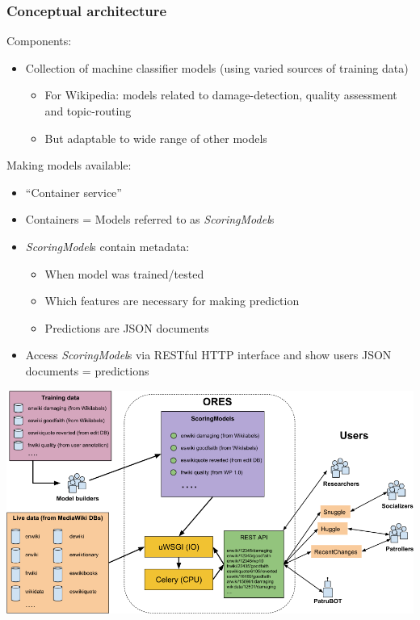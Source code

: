 \documentclass[12pt,a4paper]{article}
\begin{document}
\subsubsection{Conceptual architecture}
Components:
\begin{itemize}
\item Collection of machine classifier models (using varied sources of training data)
\begin{itemize}
\item For Wikipedia: models related to damage-detection, quality assessment and topic-routing
\item But adaptable to wide range of other models
\end{itemize}
\end{itemize}
Making models available:
\begin{itemize}
\item ``Container service''
\item Containers = Models referred to as \textit{ScoringModel}s
\item \textit{ScoringModel}s contain metadata:
\begin{itemize}
\item When model was trained/tested
\item Which features are necessary for making prediction
\item Predictions are JSON documents
\end{itemize}
\item Access \textit{ScoringModel}s via RESTful HTTP interface and show users JSON documents = predictions
\end{itemize}
\includegraphics[scale=0.4]{resources/1/ORESML}
\end{document}
